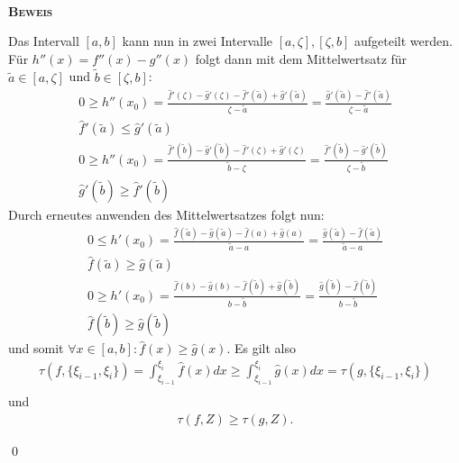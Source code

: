 \documentclass[12pt,a4paper]{scrartcl}
\numberwithin{equation}{section}
\numberwithin{myalgctr}{section}
\numberwithin{mytheoremctr}{subsection}
\numberwithin{mykorollarctr}{subsection}
\numberwithin{mylemmactr}{subsection}
\numberwithin{mybeispielctr}{subsection}
\newenvironment{myproof}{%
	\bigskip\noindent%
	\textsc{\textbf{\\Beweis\\}}%
	\indent
}{\qed\par\bigskip}  %
\begin{document}
\begin{myproof}
		Das Intervall $[a,b]$ kann nun in zwei Intervalle $[a,\zeta],[\zeta,b]$ aufgeteilt werden. F\"ur $h''(x) = f''(x)-g''(x)$ folgt dann mit dem Mittelwertsatz f\"ur $\tilde{a}\in [a,\zeta]$ und $\tilde{b}\in [\zeta,b]$:
		\begin{gather*}
			0\geq h''(x_0) = \frac{\hat{f}'(\zeta)-\hat{g}'(\zeta)-\hat{f}'(\tilde{a})+\hat{g}'(\tilde{a})}{\zeta-\tilde{a}} = \frac{\hat{g}'(\tilde{a})-\hat{f}'(\tilde{a})}{\zeta-\tilde{a}}\\
			\hat{f}'(\tilde{a})\leq \hat{g}'(\tilde{a})\\
			0\geq h''(x_0) = \frac{\hat{f}'(\tilde{b})-\hat{g}'(\tilde{b})-\hat{f}'(\zeta)+\hat{g}'(\zeta)}{\tilde{b}-\zeta} = \frac{\hat{f}'(\tilde{b})-\hat{g}'(\tilde{b})}{\zeta-\tilde{b}}\\
			\hat{g}'(\tilde{b})\geq \hat{f}'(\tilde{b})
		\end{gather*}
		Durch erneutes anwenden des Mittelwertsatzes folgt nun:
		\begin{gather*}
		0\leq h'(x_0) = \frac{\hat{f}(\tilde{a})-\hat{g}(\tilde{a})-\hat{f}(a)+\hat{g}(a)}{\tilde{a}-a} = \frac{\hat{g}(\tilde{a})-\hat{f}(\tilde{a})}{\tilde{a}-a}\\
		\hat{f}(\tilde{a})\geq \hat{g}(\tilde{a})\\
		0\geq h'(x_0) = \frac{\hat{f}(b)-\hat{g}(b)-\hat{f}(\tilde{b})+\hat{g}(\tilde{b})}{b-\tilde{b}} = 
		\frac{\hat{g}(\tilde{b})-\hat{f}(\tilde{b})}{b-\tilde{b}}\\
		\hat{f}(\tilde{b})\geq \hat{g}(\tilde{b})
		\end{gather*}
		und somit $\forall x\in[a,b]:\hat{f}(x)\geq\hat{g}(x)$. Es gilt also  
		\begin{align*}
			\tau(f,\{\xi_{i-1},\xi_i\}) = \int_{\xi_{i-1}}^{\xi_{i}}\hat{f}(x)dx\geq \int_{\xi_{i-1}}^{\xi_{i}}\hat{g}(x)dx = \tau(g,\{\xi_{i-1},\xi_i\})\\
		\end{align*}
		und 
		\begin{gather*}
		\tau(f,Z)\geq\tau(g,Z).
		\end{gather*}
		
	\end{myproof}
\end{document}
